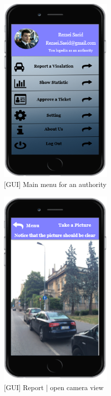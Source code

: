 \begin{figure}[H]
		\centering
      \includegraphics[width=0.5\textwidth]{GUI/MainMenuAuthority.png}
      \caption{[GUI] Main menu for an authority}   \label{fig:MainMenuAuthority}
\end{figure}

\begin{figure}[H]
		\centering
      \includegraphics[width=0.5\textwidth]{GUI/TakePicture.png}
      \caption{[GUI] Report | open camera view}   \label{fig:TakePicture}
\end{figure}



